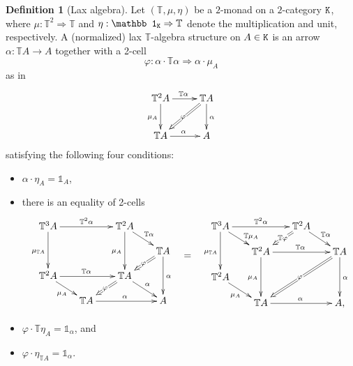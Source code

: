 \documentclass[12pt,leqno]{amsart}
\theoremstyle{definition}
\newtheorem{definition}[theorem]{Definition}
\def\T{\mathbb{T}}
\def\id{{\mathbb 1}}
\newcommand{\K}{{\tt K}}
\newcommand{\uu}{\mathbb{1}}
\newcommand{\4}{\texttt{4}}
\renewcommand{\phi}{\varphi}
\begin{document}
\begin{definition}[Lax algebra]
\label{definition:lax_alg}
Let $(\T,\mu,\eta)$ be a $2$-monad on a $2$-category $\K$,
where \hbox{$\mu : \T^2 \Rightarrow \T$} and $\eta : \id_\K
\Rightarrow \T$ denote the multiplication and unit, respectively. 
A (normalized) lax $\T$-algebra structure on $A \in \K$ is an arrow 
$\alpha\colon \T A\to A$ together with a 2-cell
    \[\phi\colon \alpha \cdot\T \alpha
\Longrightarrow \alpha\cdot \mu_A\] 
as in
\[
  \xymatrix@R=2.5em@C=2.5em{
    \T^2 A \ar[r]^{\T \alpha} \ar[d]_{\mu_A} 
    & \T A \ar[d]^{\alpha} \ar@{=>}[dl]|{\phi\rule{.1em}{0pt}}
    \\
    \T A \ar[r]^{\alpha} & A
  }
\]
satisfying the following four conditions:

\begin{itemize}[topsep=0pt, partopsep=0pt, itemsep=0pt, itemindent=-1em]
\item[(i)]
$\alpha \cdot \eta_A=\uu_A$,
\item[(ii)] 
there is an equality of 2-cells
\[
\xymatrix@R=1.2em@C=1.7em{
\T^3 A \ar[rr]^{\T^2 \alpha}\ar[dd]_{\mu_{\T A}} && \T^2 A \ar[rd]^{\T \alpha} \ar[dd]_{\mu_A}
\\
&&& \T A \ar[dd]^{\alpha} \ar@{=>}[ld]|{\phi\rule{.1em}{0pt}}
\\
\T^2 A  \ar[rr]^{\T \alpha} \ar[rd]_{\mu_A} && \T A
\ar@{=>}[ld]|{\phi\rule{.1em}{0pt}}
\ar[dr]^{\alpha}
\\
&\T A \ar[rr]^{\alpha} && A
}
\hskip 1em
\raisebox{-3em}{$=$} \hskip 1em
\xymatrix@R=1.2em@C=1.7em{
\T^3 A \ar[rr]^{\T^2 \alpha}\ar[dd]_{\mu_{\T A}} \ar[rd]^(.6){\T\mu_A}   && 
\T^2 A \ar[rd]^{\T \alpha} \ar@{=>}[ld]|(.45){\T{\phi\rule{.1em}{0pt}}}
\\
&\T^2 A  \ar[rr]^{\T \alpha}   \ar[dd]_{\mu_A}&& \T A \ar[dd]^{\alpha} 
\ar@{=>}[lldd]|{\phi\rule{.1em}{0pt}}
\\
\T^2 A \ar[rd]_{\mu_A} &&
\\
&\T A \ar[rr]^{\alpha} && A,
}
\]
\item[(iii)]
$\phi \cdot \T\eta_A=\uu_{\alpha}$, and
\item[(iv)]
$\phi \cdot \eta_{\T A}=\uu_{\alpha}$.
\end{itemize}
\end{definition}
\end{document}

